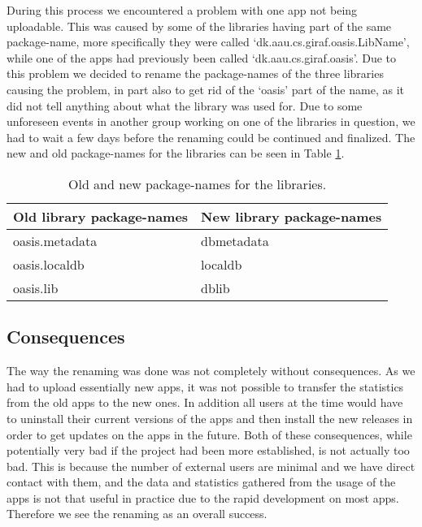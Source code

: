 During this process we encountered a problem with one app not being uploadable. This was caused by some of the libraries having part of the same package-name, more specifically they were called ‘dk.aau.cs.giraf.oasis.LibName’, while one of the apps had previously been called ‘dk.aau.cs.giraf.oasis’. Due to this problem we decided to rename the package-names of the three libraries causing the problem, in part also to get rid of the ‘oasis’ part of the name, as it did not tell anything about what the library was used for. Due to some unforeseen events in another group working on one of the libraries in question, we had to wait a few days before the renaming could be continued and finalized. The new and old package-names for the libraries can be seen in Table \ref{Sprint3_package_names_libraries}.

\begin{table} [H]
	\centering
	\begin{tabular}{ll}
		\textbf{Old library package-names} & \textbf{New library package-names}\\ \hline \noalign{\vskip 2mm}
		oasis.metadata & dbmetadata\\ \hline
		oasis.localdb & localdb\\ \hline
		oasis.lib & dblib\\ \hline
	\end{tabular}
	\caption{Old and new package-names for the libraries.}
	\label{Sprint3_package_names_libraries}
\end{table}

\subsection{Consequences}
The way the renaming was done was not completely without consequences. As we had to upload essentially new apps, it was not possible to transfer the statistics from the old apps to the new ones. In addition all users at the time would have to uninstall their current versions of the apps and then install the new releases in order to get updates on the apps in the future. Both of these consequences, while potentially very bad if the project had been more established, is not actually too bad. This is because the number of external users are minimal and we have direct contact with them, and the data and statistics gathered from the usage of the apps is not that useful in practice due to the rapid development on most apps. Therefore we see the renaming as an overall success.
\newpage
